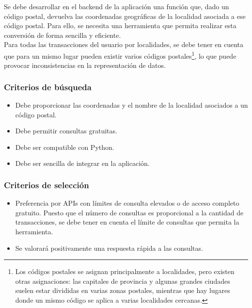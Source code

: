 Se debe desarrollar en el backend de la aplicación una función que, dado un código postal, devuelva las coordenadas geográficas de la localidad asociada a ese código postal. Para ello, se necesita una herramienta que permita realizar esta conversión de forma sencilla y eficiente.\\

Para todas las transacciones del usuario por localidades, se debe tener en cuenta que para un mismo lugar pueden existir varios códigos postales\footnote{Los códigos postales se asignan principalmente a localidades, pero existen otras asignaciones: las capitales de provincia y algunas grandes ciudades suelen estar divididas en varias zonas postales, mientras que hay lugares donde un mismo código se aplica a varias localidades cercanas\cite{cp-wikipedia}.}, lo que puede provocar inconsistencias en la representación de datos.

\subsubsection{Criterios de búsqueda}
\begin{itemize}
    \item Debe proporcionar las coordenadas y el nombre de la localidad asociados a un código postal.
    \item Debe permitir consultas gratuitas.
    \item Debe ser compatible con Python.
    \item Debe ser sencilla de integrar en la aplicación.
\end{itemize}
\subsubsection{Criterios de selección}
\begin{itemize}
    \item Preferencia por APIs con límites de consulta elevados o de acceso completo gratuito. Puesto que el número de consultas es proporcional a la cantidad de transacciones, se debe tener en cuenta el límite de consultas que permita la herramienta.
    \item Se valorará positivamente una respuesta rápida a las consultas.
\end{itemize}


